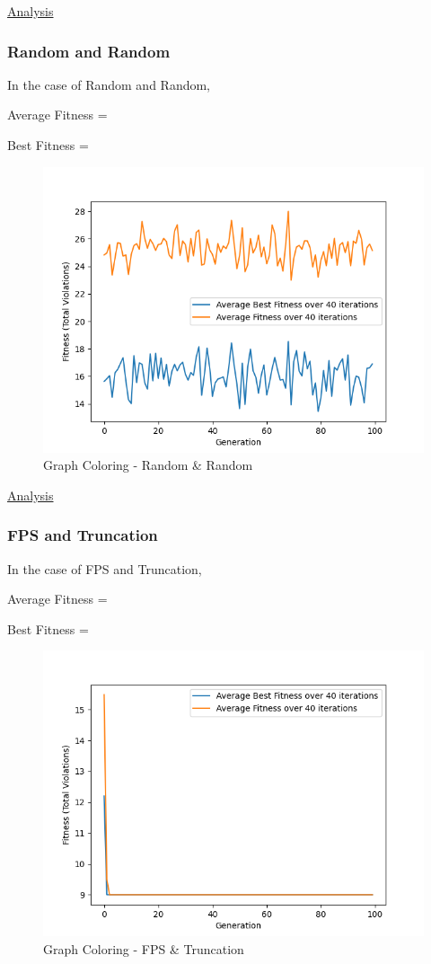 \documentclass[11pt, letterpaper]{article}
\begin{document}
\underline{Analysis}
\subsubsection {Random and Random}
In the case of Random and Random,

Average Fitness = 

Best Fitness = 
\begin{figure}[H]
    \centering
    \includegraphics[scale = 0.6]{images/graphcoloring_rd_rd.png}
    \caption {Graph Coloring - Random \& Random}
    \label {fig:gcRR}
\end{figure}

\underline{Analysis}
\subsubsection {FPS and Truncation}
In the case of FPS and Truncation,

Average Fitness = 

Best Fitness = 
\begin{figure}[H]
    \centering
    \includegraphics[scale = 0.6]{images/graphcoloring_fp_tr.png}
    \caption {Graph Coloring - FPS \& Truncation}
    \label {fig:gcFT}
\end{figure}
\end{document}
